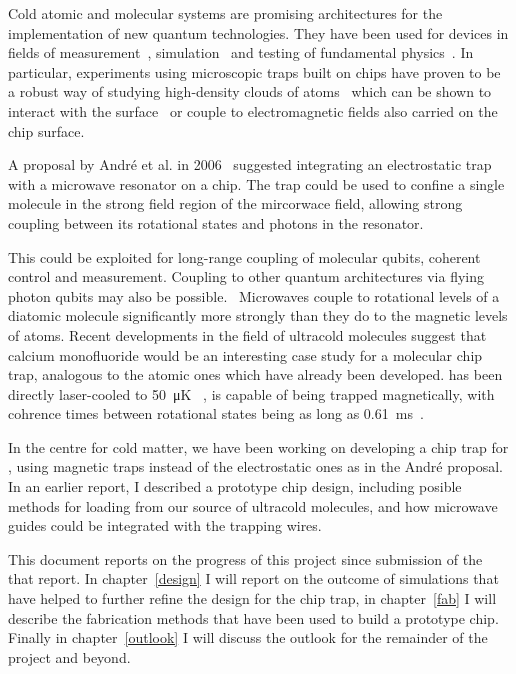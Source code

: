 Cold atomic and molecular systems are promising architectures for the
implementation of new quantum technologies. They have been used for devices in
fields of measurement~\cite{PhysRevLett.120.103201}, simulation~\cite{Gross995}
and testing of fundamental physics~\cite{DeMille990}.  In particular,
experiments using microscopic traps built on chips have proven to be a robust
way of studying high-density clouds of atoms~\cite{Reichel1999, Ott2001} which
can be shown to interact with the surface~\cite{} or couple to electromagnetic
fields also carried on the chip surface.~\cite{Treutlein2008, Hinds??}

A proposal by Andr\'e et al. in 2006~\cite{Andre2006} suggested integrating an
electrostatic trap with a microwave resonator on a chip. The trap could be used
to confine a single molecule in the strong field region of the mircorwace
field, allowing strong coupling between its rotational states and photons in
the resonator.


This could be exploited for long-range coupling of molecular
qubits, coherent control and measurement. Coupling to other quantum
architectures via flying photon qubits may also be
possible.~\cite{PhysRevLett.92.063601}
Microwaves couple to rotational levels of a diatomic molecule
significantly more strongly than they do to the magnetic levels of atoms.
Recent developments in the field of ultracold molecules suggest that calcium
monofluoride would be an interesting case study for a molecular chip trap,
analogous to the atomic ones which have already been developed. \CaF{} has been
directly laser-cooled to \SI{50}{\micro\kelvin} ~\cite{}, is capable of being
trapped magnetically, with cohrence times between rotational states
being as long as
\SI{0.61}{\milli\second}~\cite{Blackmore_2018}. 

In the centre for cold matter, we have been working on developing a chip trap
for \CaF{}, using magnetic traps instead of the electrostatic ones as in the
Andr\'e proposal. In an earlier report, I described a prototype chip design,
including posible methods for loading from our source of ultracold molecules,
and how microwave guides could be integrated with the trapping wires.

This document reports on the progress of this project since submission of the
that report.  In chapter~\ref{design} I will report on the outcome of
simulations that have helped to further refine the design for the chip trap, in
chapter~\ref{fab} I will describe the fabrication methods that have been used
to build a prototype chip. Finally in chapter~\ref{outlook} I will discuss the
outlook for the remainder of the project and beyond.

